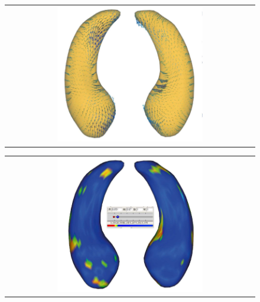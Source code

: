 \documentclass{InsightArticle}
\begin{document}
\begin{figure}[htbp]
  \begin{center}
    \begin{tabular}[htbp]{c}
    \includegraphics[width=0.6\textwidth]{IJ_AnalysisScenario2_Vectors}
    \end{tabular}
    \label{fig:vectors}
  \end{center}
\end{figure}

\begin{figure}[htbp]
  \begin{center}
    \begin{tabular}[htbp]{c}
    \includegraphics[width=0.6\textwidth]{IJ_AnalysisScenario2_RawPValues}
    \end{tabular}
    \label{fig:pvals}
  \end{center}
\end{figure}
\end{document}

